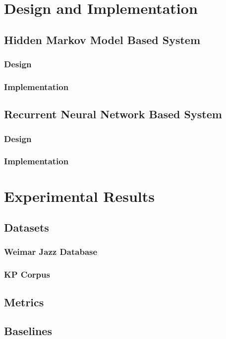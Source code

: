 \documentclass[bsc,singlespacing,logo, parskip, deptreport]{infthesis}
\begin{document}
\chapter{Design and Implementation}

\section{Hidden Markov Model Based System}
\subsection{Design}
\subsection{Implementation}

\section{Recurrent Neural Network Based System}
\subsection{Design}
\subsection{Implementation}


\chapter{Experimental Results}

\section{Datasets}
\subsection{Weimar Jazz Database}
\subsection{KP Corpus}

\section{Metrics}

\section{Baselines}
\end{document}
